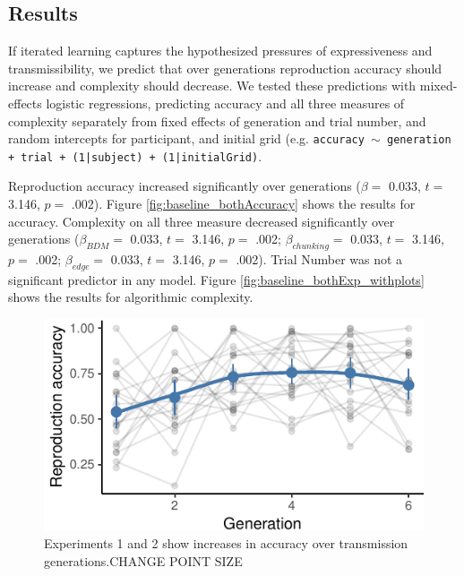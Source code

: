 \documentclass[10pt, letterpaper]{article}
\newenvironment{CodeChunk}{}{}
\begin{document}
\subsection{Results}\label{results}

If iterated learning captures the hypothesized pressures of
expressiveness and transmissibility, we predict that over generations
reproduction accuracy should increase and complexity should decrease. We
tested these predictions with mixed-effects logistic regressions,
predicting accuracy and all three measures of complexity separately from
fixed effects of generation and trial number, and random intercepts for
participant, and initial grid (e.g.
\texttt{accuracy $\sim$ generation + trial +  (1|subject) + (1|initialGrid)}.

Reproduction accuracy increased significantly over generations
(\(\beta =\) 0.033, \(t =\) 3.146, \(p =\) .002). Figure
\ref{fig:baseline_bothAccuracy} shows the results for accuracy.
Complexity on all three measure decreased significantly over generations
(\(\beta_{BDM} =\) 0.033, \(t =\) 3.146, \(p =\) .002;
\(\beta_{chunking} =\) 0.033, \(t =\) 3.146, \(p =\) .002;
\(\beta_{edge} =\) 0.033, \(t =\) 3.146, \(p =\) .002). Trial Number was
not a significant predictor in any model. Figure
\ref{fig:baseline_bothExp_withplots} shows the results for algorithmic
complexity.

\begin{CodeChunk}
\begin{figure}[tb]

{\centering \includegraphics{figs/e1_acc_plot-1} 

}

\caption[Experiments 1 and 2 show increases in accuracy over transmission generations.CHANGE POINT SIZE]{Experiments 1 and 2 show increases in accuracy over transmission generations.CHANGE POINT SIZE}\label{fig:e1_acc_plot}
\end{figure}
\end{CodeChunk}
\end{document}

